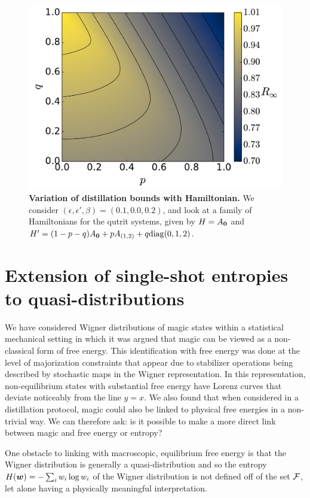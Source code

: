 \documentclass[pra,
aps,
twocolumn,
superscriptaddress,
groupedaddress,
nofootinbib,
reprint
]{revtex4-1}
\begin{document}
\begin{figure}
    \centering
    \includegraphics[scale=0.35]{figs/R_vs_A.pdf}
    \caption{\textbf{Variation of distillation bounds with Hamiltonian.} We consider $(\epsilon, \epsilon', \beta) = (0.1, 0.0, 0.2)$, and look at a family of Hamiltonians for the qutrit systems, given by $H = A_{\bm{0}}$ and $H' = (1-p-q)A_{\bm{0}}+pA_{(1,2)}+q{\rm{diag}}(0,1,2)$.
    }
    \label{fig:rvsa}
\end{figure}

\section{Extension of single-shot entropies to quasi-distributions}\label{section:entropies}
We have considered Wigner distributions of magic states within a statistical mechanical setting in which it was argued that magic can be viewed as a non-classical form of free energy. This identification with free energy was done at the level of majorization constraints that appear due to stabilizer operations being described by stochastic maps in the Wigner representation. In this representation, non-equilibrium states with substantial free energy have Lorenz curves that deviate noticeably from the line $y=x$. We also found that when considered in a distillation protocol, magic could also be linked to physical free energies in a non-trivial way. We can therefore ask: is it possible to make a more direct link between magic and free energy or entropy?

One obstacle to linking with macroscopic, equilibrium free energy is that the Wigner distribution is generally a quasi-distribution and so the entropy $H(\boldsymbol{w}) = -\sum_i w_i \log w_i$ of the Wigner distribution is not defined off of the set ${\mathcal F}$, let alone having a physically meaningful interpretation. 
\end{document}
